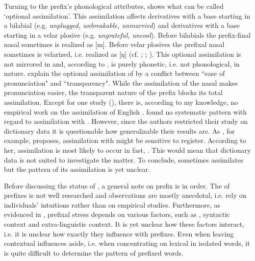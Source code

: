 Turning to the prefix's phonological attributes,  shows what can be called `optional assimilation'. This assimilation affects derivatives with a base starting in a bilabial (e.g. \textit{unplugged, unbreakable, unmarried}) and derivatives with a base starting in a velar plosive (e.g. \textit{ungrateful, uncool}).
Before bilabials the prefix-final nasal sometimes is realized as [m]. Before velar plosives the prefixal nasal sometimes is velarized, i.e. realized as [ŋ] (cf. \citealt[5 f]{Hanote.2010}; \citealt[180]{Bauer.2013}; \citealt[125]{Okada.2013}). 
This optional assimilation is not mirrored in  and, according to \citet[125]{Okada.2013}, is purely phonetic, i.e. not phonological, in nature. \citet[87 f]{Stockwell.2001} explain the optional assimilation of  by a conflict between ``ease of pronunciation" and ``transparency". While the assimilation of the nasal makes pronunciation easier, the transparent nature of the prefix blocks its total assimilation.
Except for one study (\citealt{Hanote.2010}), there is, according to my knowledge, no empirical work on the assimilation of English . \cite{Hanote.2010} found no systematic pattern with regard to assimilation with . However, since the authors restricted their study on dictionary data it is questionable how generalizable their results are.  
As \citet[138]{Raffelsiefen.1999}, for example, proposes, assimilation with  might be sensitive to register.  According to her,  assimilation is most likely to occur in fast, . This would mean that dictionary data is not suited to investigate the matter.
To conclude,  sometimes assimilates but the pattern of its assimilation is yet unclear.




Before discussing the  status of , a general note on prefix  is in order. The  of prefixes is not well researched and observations are mostly anecdotal, i.e. rely on individuals' intuitions rather than on empirical studies. Furthermore, as evidenced in \cite{Videau.2015}, prefixal stress depends on various factors, such as , syntactic context and extra-linguistic context. It is yet unclear how these factors interact, i.e. it is unclear how exactly they influence  with prefixes.
Even when leaving contextual influences aside, i.e. when concentrating on lexical  in isolated words, it is quite difficult to determine the  pattern of prefixed words. 

